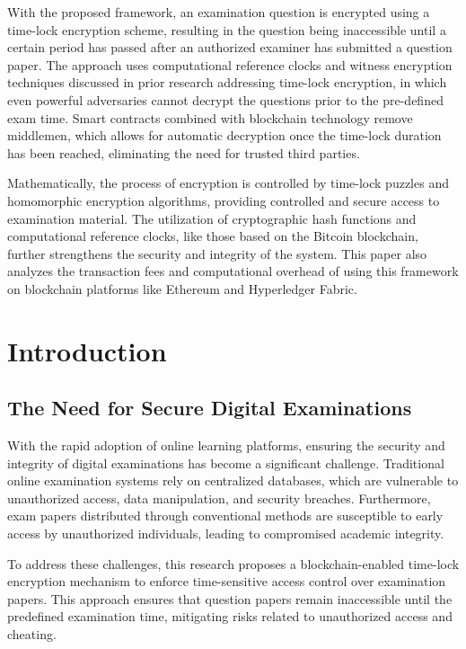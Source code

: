 \documentclass[12pt,a4paper]{article}
\begin{document}
With the proposed framework, an examination question is encrypted using a time-lock encryption scheme, resulting in the question being inaccessible until a certain period has passed after an authorized examiner has submitted a question paper. The approach uses computational reference clocks and witness encryption techniques discussed in prior research addressing time-lock encryption, in which even powerful adversaries cannot decrypt the questions prior to the pre-defined exam time. Smart contracts combined with blockchain technology remove middlemen, which allows for automatic decryption once the time-lock duration has been reached, eliminating the need for trusted third parties.

Mathematically, the process of encryption is controlled by time-lock puzzles and homomorphic encryption algorithms, providing controlled and secure access to examination material. The utilization of cryptographic hash functions and computational reference clocks, like those based on the Bitcoin blockchain, further strengthens the security and integrity of the system. This paper also analyzes the transaction fees and computational overhead of using this framework on blockchain platforms like Ethereum and Hyperledger Fabric.

\clearpage
\tableofcontents
\newpage
\clearpage
\section{Introduction}
\subsection{The Need for Secure Digital Examinations}
With the rapid adoption of online learning platforms, ensuring the security and integrity of digital examinations has become a significant challenge. Traditional online examination systems rely on centralized databases, which are vulnerable to unauthorized access, data manipulation, and security breaches. Furthermore, exam papers distributed through conventional methods are susceptible to early access by unauthorized individuals, leading to compromised academic integrity.

To address these challenges, this research proposes a blockchain-enabled time-lock encryption mechanism to enforce time-sensitive access control over examination papers. This approach ensures that question papers remain inaccessible until the predefined examination time, mitigating risks related to unauthorized access and cheating.
\end{document}
